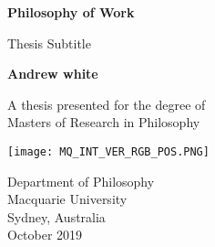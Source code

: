

\begin{titlepage} %
   \begin{center} %
       \vspace*{1cm} %
 
        \Huge %
        \textbf{Philosophy of Work} %
 
        \LARGE %
        \vspace{0.5cm} %
        Thesis Subtitle
 
        \vspace{1.5cm} %
 
        \textbf{Andrew white}
 
        \vfill %
 
       A thesis presented for the degree of\\
       Masters of Research in Philosophy
 
       \vspace{0.8cm}
 
       \texttt{[image: MQ\_INT\_VER\_RGB\_POS.PNG]} %
 
    \Large  %
       Department of Philosophy\\
       Macquarie University\\
       Sydney, Australia\\
       October 2019
 
   \end{center} %
\end{titlepage} %
